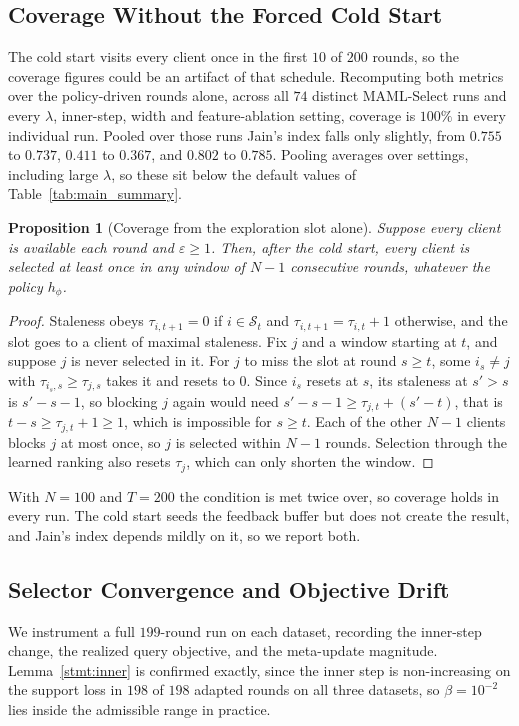 \documentclass[journal]{IEEEtran}
\newtheorem{proposition}{Proposition}
\theoremstyle{remark}
\newcommand{\revtwo}[1]{#1}
\begin{document}
\subsection{\revtwo{Coverage Without the Forced Cold Start}}\label{sec:fairness_recheck}
\revtwo{The cold start visits every client once in the first $10$ of $200$ rounds, so the coverage figures could be an artifact of that schedule. Recomputing both metrics over the policy-driven rounds alone, across all $74$ distinct MAML-Select runs and every $\lambda$, inner-step, width and feature-ablation setting, coverage is $100\%$ in every individual run. Pooled over those runs Jain's index falls only slightly, from $0.755$ to $0.737$, $0.411$ to $0.367$, and $0.802$ to $0.785$. Pooling averages over settings, including large $\lambda$, so these sit below the default values of Table~\ref{tab:main_summary}.}

\begin{proposition}[\revtwo{Coverage from the exploration slot alone}]\label{prop:coverage}
\revtwo{Suppose every client is available each round and $\varepsilon\ge 1$. Then, after the cold start, every client is selected at least once in any window of $N-1$ consecutive rounds, whatever the policy $h_\phi$.}
\end{proposition}
\begin{proof}
\revtwo{Staleness obeys $\tau_{i,t+1}=0$ if $i\in\mathcal{S}_t$ and $\tau_{i,t+1}=\tau_{i,t}+1$ otherwise, and the slot goes to a client of maximal staleness. Fix $j$ and a window starting at $t$, and suppose $j$ is never selected in it. For $j$ to miss the slot at round $s\ge t$, some $i_s\neq j$ with $\tau_{i_s,s}\ge\tau_{j,s}$ takes it and resets to $0$. Since $i_s$ resets at $s$, its staleness at $s'>s$ is $s'-s-1$, so blocking $j$ again would need $s'-s-1\ge\tau_{j,t}+(s'-t)$, that is $t-s\ge\tau_{j,t}+1\ge 1$, which is impossible for $s\ge t$. Each of the other $N-1$ clients blocks $j$ at most once, so $j$ is selected within $N-1$ rounds. Selection through the learned ranking also resets $\tau_j$, which can only shorten the window.}
\end{proof}
\revtwo{With $N=100$ and $T=200$ the condition is met twice over, so coverage holds in every run. The cold start seeds the feedback buffer but does not create the result, and Jain's index depends mildly on it, so we report both.}

\subsection{\revtwo{Selector Convergence and Objective Drift}}\label{sec:selector_convergence}
\revtwo{We instrument a full $199$-round run on each dataset, recording the inner-step change, the realized query objective, and the meta-update magnitude. Lemma~\ref{stmt:inner} is confirmed exactly, since the inner step is non-increasing on the support loss in $198$ of $198$ adapted rounds on all three datasets, so $\beta=10^{-2}$ lies inside the admissible range in practice.}
\end{document}
